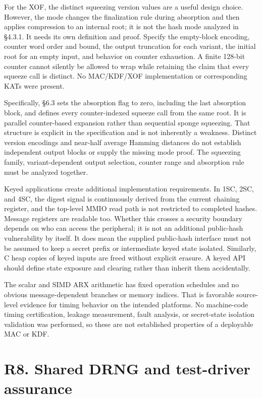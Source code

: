 \documentclass[
  english,
  11pt,
  a4paper,
]{article}
\begin{document}
For the XOF, the distinct squeezing version values are a useful design
choice. However, the mode changes the finalization rule during
absorption and then applies compression to an internal root; it is not
the hash mode analyzed in §4.3.1. It needs its own definition and proof.
Specify the empty-block encoding, counter word order and bound, the
output truncation for each variant, the initial root for an empty input,
and behavior on counter exhaustion. A finite 128-bit counter cannot
silently be allowed to wrap while retaining the claim that every squeeze
call is distinct. No MAC/KDF/XOF implementation or corresponding KATs
were present.

Specifically, §6.3 sets the absorption flag to zero, including the last
absorption block, and defines every counter-indexed squeeze call from
the same root. It is parallel counter-based expansion rather than
sequential sponge squeezing. That structure is explicit in the
specification and is not inherently a weakness. Distinct version
encodings and near-half average Hamming distances do not establish
independent output blocks or supply the missing mode proof. The
squeezing family, variant-dependent output selection, counter range and
absorption rule must be analyzed together.

Keyed applications create additional implementation requirements. In
1SC, 2SC, and 4SC, the digest signal is continuously derived from the
current chaining register, and the top-level MMIO read path is not
restricted to completed hashes. Message registers are readable too.
Whether this crosses a security boundary depends on who can access the
peripheral; it is not an additional public-hash vulnerability by itself.
It does mean the supplied public-hash interface must not be assumed to
keep a secret prefix or intermediate keyed state isolated. Similarly, C
heap copies of keyed inputs are freed without explicit erasure. A keyed
API should define state exposure and clearing rather than inherit them
accidentally.

The scalar and SIMD ARX arithmetic has fixed operation schedules and no
obvious message-dependent branches or memory indices. That is favorable
source-level evidence for timing behavior on the intended platforms. No
machine-code timing certification, leakage measurement, fault analysis,
or secret-state isolation validation was performed, so these are not
established properties of a deployable MAC or KDF.


\section{R8. Shared DRNG and test-driver
assurance}\label{r8.-shared-drng-and-test-driver-assurance}
\end{document}
